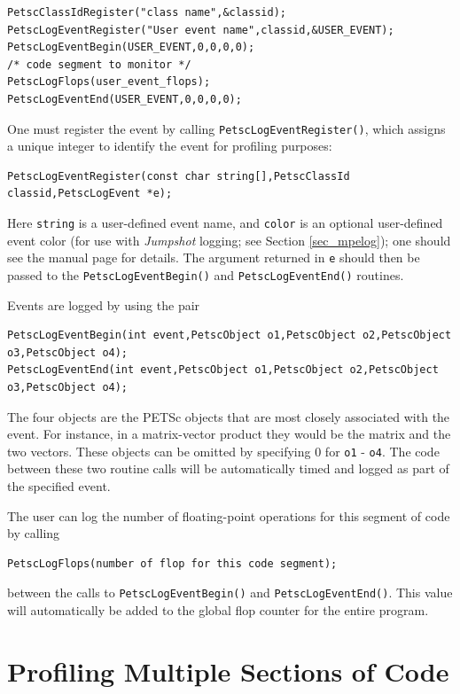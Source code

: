 {{\begin{lstlisting}
PetscClassIdRegister("class name",&classid);
PetscLogEventRegister("User event name",classid,&USER_EVENT);
PetscLogEventBegin(USER_EVENT,0,0,0,0);
/* code segment to monitor */
PetscLogFlops(user_event_flops);
PetscLogEventEnd(USER_EVENT,0,0,0,0);
\end{lstlisting}

One must register the event by calling \lstinline{PetscLogEventRegister()}, which assigns a unique integer to identify the
event for profiling purposes:
\begin{lstlisting}
PetscLogEventRegister(const char string[],PetscClassId classid,PetscLogEvent *e);
\end{lstlisting}
Here \lstinline{string} is a user-defined event name, and \lstinline{color} is an
optional user-defined event color (for use with {\em Jumpshot} logging; see Section \ref{sec_mpelog});
one should see the manual page for details.  The argument returned in \lstinline{e} should then
be passed to the \lstinline{PetscLogEventBegin()} and \lstinline{PetscLogEventEnd()}
routines.

Events are logged by using the pair
\begin{lstlisting}
PetscLogEventBegin(int event,PetscObject o1,PetscObject o2,PetscObject o3,PetscObject o4);
PetscLogEventEnd(int event,PetscObject o1,PetscObject o2,PetscObject o3,PetscObject o4);
\end{lstlisting}
The four objects are the PETSc objects that are most closely associated
with the event.  For instance, in a matrix-vector product they
would be the matrix and the two vectors.  These objects can be omitted
by specifying 0 for \lstinline{o1} - \lstinline{o4}.  The code between these
two routine calls will be automatically timed and logged as part of the
specified event.

The user can log the number of floating-point operations
for this segment of code by calling
\begin{lstlisting}
PetscLogFlops(number of flop for this code segment);
\end{lstlisting}
between the calls to \lstinline{PetscLogEventBegin()} and \lstinline{PetscLogEventEnd()}.
This value will automatically be added to the global flop counter for the
entire program.

\section{Profiling Multiple Sections of Code}
\label{sec_profstages}

}}
